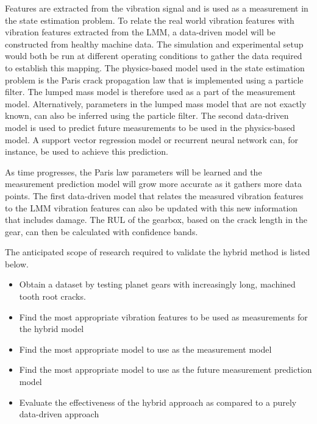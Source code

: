 Features are extracted from the vibration signal and is used as a measurement in the state estimation problem. To relate the real world vibration features with vibration features extracted from the LMM, a data-driven model will be constructed from healthy machine data. The simulation and experimental setup would both be run at different operating conditions to gather the data required to establish this mapping. The physics-based model used in the state estimation problem is the Paris crack propagation law that is implemented using a particle filter. The lumped mass model is therefore used as a part of the measurement model. Alternatively, parameters in the lumped mass model that are not exactly known, can also be inferred using the particle filter. The second data-driven model is used to predict future measurements to be used in the physics-based model. A support vector regression model or recurrent neural network can, for instance, be used to achieve this prediction. 

As time progresses, the Paris law parameters will be learned and the measurement prediction model will grow more accurate as it gathers more data points. The first data-driven model that relates the measured vibration features to the LMM vibration features can also be updated with this new information that includes damage. The RUL of the gearbox, based on the crack length in the gear, can then be calculated with confidence bands.

The anticipated scope of research required to validate the hybrid method is listed below.
\begin{itemize}
	\item Obtain a dataset by testing planet gears with increasingly long, machined tooth root cracks.
	\item Find the most appropriate vibration features to be used as measurements for the hybrid model
	\item Find the most appropriate model to use as the measurement model
	\item Find the most appropriate model to use as the future measurement prediction model
	\item Evaluate the effectiveness of the hybrid approach as compared to a purely data-driven approach
\end{itemize}






